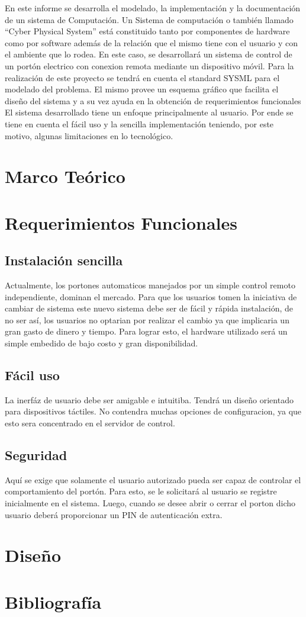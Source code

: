 \documentclass[16pt, article,notitlepage]{article}
\begin{document}
En este informe se desarrolla el modelado, la implementación y la documentación de un sistema de Computación. Un Sistema de computación o también llamado “Cyber Physical System” está constituido tanto por componentes de hardware como por software además de la relación que el mismo tiene con el usuario y con el ambiente que lo rodea. En este caso, se desarrollará un sistema de control de un portón electrico con conexion remota mediante un dispositivo móvil.
Para la realización de este proyecto se tendrá en cuenta el standard SYSML para el modelado del problema. El mismo provee un esquema gráfico que facilita el diseño del sistema y a su vez ayuda en la obtención de requerimientos funcionales
El sistema desarrollado tiene un enfoque principalmente al usuario. Por ende se tiene en cuenta el fácil uso y la sencilla implementación teniendo, por este motivo, algunas limitaciones en lo tecnológico.

\section{Marco Teórico}
\section{Requerimientos Funcionales}
\subsection{Instalación sencilla}
Actualmente, los portones automaticos manejados por un simple control remoto independiente, dominan el mercado. Para que los usuarios tomen la iniciativa de cambiar de sistema este nuevo sistema debe ser de fácil y rápida instalación, de no ser así, los usuarios no optarian por realizar el cambio ya que implicaria un gran gasto de dinero y tiempo.
Para lograr esto, el hardware utilizado será un simple embedido de bajo costo y gran disponibilidad. 
\subsection{Fácil uso}
La inerfáz de usuario debe ser amigable e intuitiba. Tendrá un diseño orientado para dispositivos táctiles. No contendra muchas opciones de configuracion, ya que esto sera concentrado en el servidor de control.
\subsection{Seguridad}
Aquí se exige que solamente el usuario autorizado pueda ser capaz de controlar el comportamiento del portón. Para esto, se le solicitará al usuario se registre inicialmente en el sistema. Luego, cuando se desee abrir o cerrar el porton dicho usuario deberá proporcionar un PIN de autenticación extra.
\section{Diseño}
\section{Bibliografía}



\end{document}
